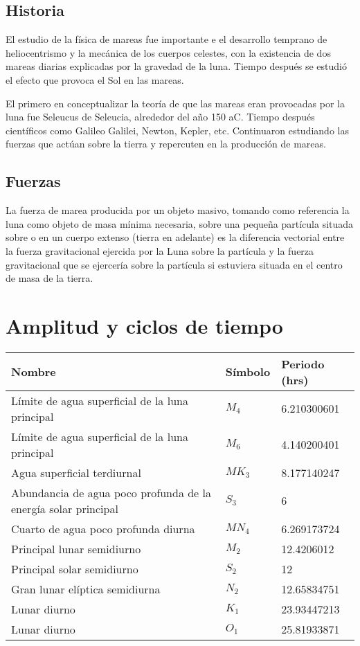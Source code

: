\subsection{Historia}
\noindent El estudio de la física de mareas fue importante e el desarrollo temprano de heliocentrismo y la mecánica de los cuerpos celestes, con la existencia de dos mareas diarias explicadas por la gravedad de la luna. Tiempo después se estudió el efecto que provoca el Sol en las mareas.

El primero en conceptualizar la teoría de que las mareas eran provocadas por la luna fue Seleucus de Seleucia, alrededor del año 150 aC. Tiempo después científicos como Galileo Galilei, Newton, Kepler, etc. Continuaron estudiando las fuerzas que actúan sobre la tierra y repercuten en la producción de mareas.
\subsection{Fuerzas}
\noindent La fuerza de marea producida por un objeto masivo, tomando como referencia la luna como objeto de masa mínima necesaria, sobre una pequeña partícula situada sobre o en un cuerpo extenso (tierra en adelante) es la diferencia vectorial entre la fuerza gravitacional ejercida por la Luna sobre la partícula y la fuerza gravitacional que se ejercería sobre la partícula si estuviera situada en el centro de masa de la tierra. 
\section{Amplitud y ciclos de tiempo}
\begin{table}[htbp]
\begin{center}
\begin{tabular}{|l|l|l|}
\hline \hline
Nombre & Símbolo & Periodo (hrs)  \\
\hline \hline
Límite de agua superficial de la luna principal & $M_{4}$ & 6.210300601 \\ \hline
Límite de agua superficial de la luna principal & $M_{6}$ & 4.140200401 	\\ \hline
Agua superficial terdiurnal & $MK_{3}$ & 8.177140247 \\ \hline
Abundancia de agua poco profunda de la energía solar principal & $S_{3}$ & 6 \\ \hline
Cuarto de agua poco profunda diurna &  $MN_{4}$  & 6.269173724 \\ \hline
Principal lunar semidiurno & $M_{2}$ & 12.4206012 \\ \hline
Principal solar semidiurno & $S_{2}$ & 12 \\ \hline
Gran lunar elíptica semidiurna & $N_{2}$ & 12.65834751 \\ \hline
Lunar diurno & $K_{1}$ & 23.93447213  \\ \hline
Lunar diurno & $O_{1}$ & 25.81933871 \\ \hline
\end{tabular}
\label{tabla:sencilla}
\end{center}
\end{table}

